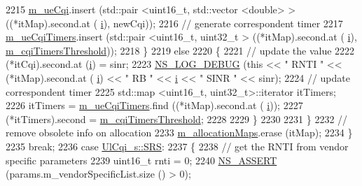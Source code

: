 \begin{DoxyCode}
2215                 \hyperlink{classns3_1_1FdTbfqFfMacScheduler_a74c33465af3fd4306d994e9942836a27}{m\_ueCqi}.insert (std::pair <uint16\_t, std::vector <double> > ((*itMap).second.at (
      \hyperlink{bernuolliDistribution_8m_a6f6ccfcf58b31cb6412107d9d5281426}{i}), newCqi));
2216                 \textcolor{comment}{// generate correspondent timer}
2217                 \hyperlink{classns3_1_1FdTbfqFfMacScheduler_a86890d454debae559e2a13f86c0b829c}{m\_ueCqiTimers}.insert (std::pair <uint16\_t, uint32\_t > ((*itMap).second.at (
      \hyperlink{bernuolliDistribution_8m_a6f6ccfcf58b31cb6412107d9d5281426}{i}), \hyperlink{classns3_1_1FdTbfqFfMacScheduler_a5699ce6b376d8919bd386101b5c55e4a}{m\_cqiTimersThreshold}));
2218               \}
2219             \textcolor{keywordflow}{else}
2220               \{
2221                 \textcolor{comment}{// update the value}
2222                 (*itCqi).second.at (\hyperlink{bernuolliDistribution_8m_a6f6ccfcf58b31cb6412107d9d5281426}{i}) = sinr;
2223                 \hyperlink{group__logging_ga413f1886406d49f59a6a0a89b77b4d0a}{NS\_LOG\_DEBUG} (\textcolor{keyword}{this} << \textcolor{stringliteral}{" RNTI "} << (*itMap).second.at (
      \hyperlink{bernuolliDistribution_8m_a6f6ccfcf58b31cb6412107d9d5281426}{i}) << \textcolor{stringliteral}{" RB "} << \hyperlink{bernuolliDistribution_8m_a6f6ccfcf58b31cb6412107d9d5281426}{i} << \textcolor{stringliteral}{" SINR "} << sinr);
2224                 \textcolor{comment}{// update correspondent timer}
2225                 std::map <uint16\_t, uint32\_t>::iterator itTimers;
2226                 itTimers = \hyperlink{classns3_1_1FdTbfqFfMacScheduler_a86890d454debae559e2a13f86c0b829c}{m\_ueCqiTimers}.find ((*itMap).second.at (
      \hyperlink{bernuolliDistribution_8m_a6f6ccfcf58b31cb6412107d9d5281426}{i}));
2227                 (*itTimers).second = \hyperlink{classns3_1_1FdTbfqFfMacScheduler_a5699ce6b376d8919bd386101b5c55e4a}{m\_cqiTimersThreshold};
2228 
2229               \}
2230 
2231           \}
2232         \textcolor{comment}{// remove obsolete info on allocation}
2233         \hyperlink{classns3_1_1FdTbfqFfMacScheduler_a5f22054304388f5f9469e3591b3bedea}{m\_allocationMaps}.erase (itMap);
2234       \}
2235       \textcolor{keywordflow}{break};
2236     \textcolor{keywordflow}{case} \hyperlink{structns3_1_1UlCqi__s_aece9e5ebea42eb9ff1744c72c8459b57af4b6dba4243636562c910c4d4761dd7e}{UlCqi\_s::SRS}:
2237       \{
2238         \textcolor{comment}{// get the RNTI from vendor specific parameters}
2239         uint16\_t rnti = 0;
2240         \hyperlink{assert_8h_a6dccdb0de9b252f60088ce281c49d052}{NS\_ASSERT} (params.m\_vendorSpecificList.size () > 0);

\end{DoxyCode}
